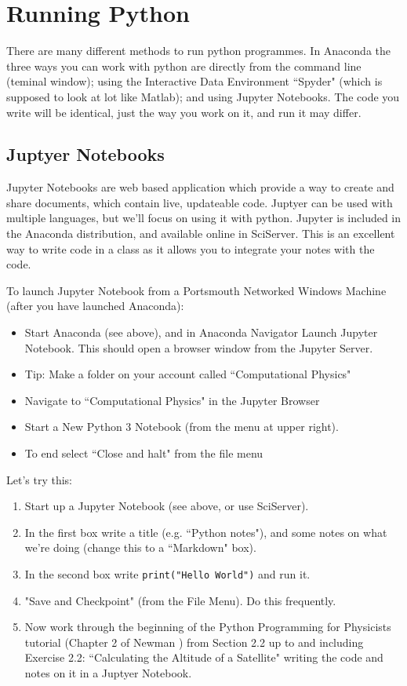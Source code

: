 \documentclass[%
 reprint,
 amsmath,amssymb,
 aps,
]{revtex4-1}
\begin{document}
\section{Running Python}

There are many different methods to run python programmes. In Anaconda the three ways you can work with python are directly from the command line (teminal window); using the Interactive Data Environment ``Spyder" (which is supposed to look at lot like Matlab); and using Jupyter Notebooks. The code you write will be identical, just the way you work on it, and run it may differ. 

\subsection{Juptyer Notebooks}

Jupyter Notebooks are web based application which provide a way to create and share documents, which contain live, updateable code. Juptyer can be used with multiple languages, but we'll focus on using it with python. Jupyter is included in the Anaconda distribution, and available online in SciServer. This is an excellent way to write code in a class as it allows you to integrate your notes with the code. 

To launch Jupyter Notebook from a Portsmouth Networked Windows Machine (after you have launched Anaconda): 
\begin{itemize}
\item Start Anaconda (see above), and in Anaconda Navigator Launch Jupyter Notebook. This should open a browser window from the Jupyter Server. 
\item Tip: Make a folder on your account called ``Computational Physics"
\item Navigate to ``Computational Physics" in the Jupyter Browser
\item Start a New Python 3 Notebook (from the menu at upper right).
\item To end select ``Close and halt" from the file menu
\end{itemize}

Let's try this: 
\begin{enumerate}
\item Start up a Jupyter Notebook (see above, or use SciServer).
\item In the first box write a title (e.g. ``Python notes"), and some notes on what we're doing (change this to a ``Markdown" box).
\item In the second box write {\tt print("Hello World")} and run it. 
\item "Save and Checkpoint" (from the File Menu). Do this frequently. 
\item Now work through the beginning of the Python Programming for Physicists tutorial (Chapter 2 of Newman \cite{newman}) from Section 2.2 up to and including Exercise 2.2: ``Calculating the Altitude of a Satellite" writing the code and notes on it in a Juptyer Notebook.
\end{enumerate}
\end{document}
